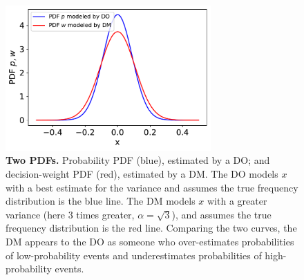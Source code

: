 \documentclass[a4paper, 12pt]{article}
\newcommand{\flabel}[1]{\label{fig:#1}}
\newcommand{\Secref}[1]{Section~\ref{sec:#1}}
\newcommand{\ND}{\mathcal{N}} %
\begin{document}
\begin{figure}[htb]
\centering
\includegraphics[width=0.7\textwidth]{./figs/probability_dists.pdf}
\caption{{\bf Two PDFs.} Probability PDF (blue), estimated by a DO; and decision-weight PDF (red), estimated by a DM. The DO models $x$ with a best estimate for the variance and assumes the true frequency distribution is the blue line. The DM models $x$ with a greater variance (here 3 times greater, $\alpha=\sqrt{3}$), and assumes the true frequency distribution is the red line. Comparing the two curves, the DM appears to the DO as someone who over-estimates probabilities of low-probability events and underestimates probabilities of high-probability events.}
\flabel{probability_dists}
\end{figure}
%
%
%
\end{document}
